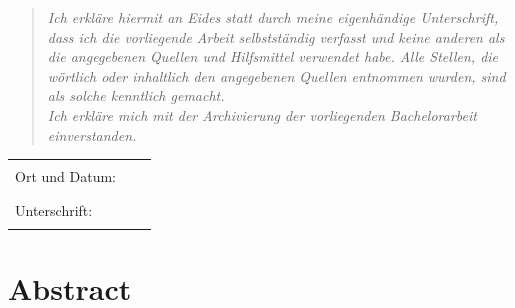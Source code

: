 \documentclass[12pt,oneside,bibtotoc,liststotoc]{scrbook}
\begin{document}
\begin{quote}
    \emph{Ich erkläre hiermit an Eides statt durch meine eigenhändige Unterschrift, dass ich die vorliegende Arbeit selbstständig verfasst und keine anderen als die angegebenen Quellen und Hilfsmittel verwendet habe. Alle Stellen, die wörtlich oder inhaltlich den angegebenen Quellen entnommen wurden, sind als solche kenntlich gemacht.
        \\Ich erkläre mich mit der Archivierung der vorliegenden Bachelorarbeit einverstanden.
    }
\end{quote}
\vspace{2.5cm}

\begin{flushleft}
    \begin{tabular}{lll}
        Ort und Datum: &  & \rule{7cm}{0.4pt} \\[7ex]
        Unterschrift:  &  & \rule{7cm}{0.4pt}
    \end{tabular}
\end{flushleft}

\thispagestyle{empty}

\renewcommand{\baselinestretch}{1.00}\normalsize

\tableofcontents
\setcounter{page}{1}
\listoffigures
\renewcommand{\baselinestretch}{1.5}\normalsize

\newpage
\setcounter{page}{1}

\chapter*{Abstract}
\end{document}
